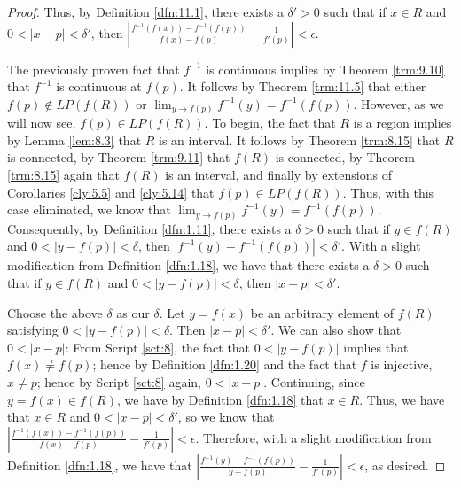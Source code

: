 \documentclass[../main.tex]{subfiles}
\begin{document}
\begin{theorem}
\begin{proof}
        Thus, by Definition \ref{dfn:11.1}, there exists a $\delta'>0$ such that if $x\in R$ and $0<|x-p|<\delta'$, then $|\frac{f^{-1}(f(x))-f^{-1}(f(p))}{f(x)-f(p)}-\frac{1}{f'(p)}|<\epsilon$.\par
        The previously proven fact that $f^{-1}$ is continuous implies by Theorem \ref{trm:9.10} that $f^{-1}$ is continuous at $f(p)$. It follows by Theorem \ref{trm:11.5} that either $f(p)\notin LP(f(R))$ or $\lim_{y\to f(p)}f^{-1}(y)=f^{-1}(f(p))$. However, as we will now see, $f(p)\in LP(f(R))$. To begin, the fact that $R$ is a region implies by Lemma \ref{lem:8.3} that $R$ is an interval. It follows by Theorem \ref{trm:8.15} that $R$ is connected, by Theorem \ref{trm:9.11} that $f(R)$ is connected, by Theorem \ref{trm:8.15} again that $f(R)$ is an interval, and finally by extensions of Corollaries \ref{cly:5.5} and \ref{cly:5.14} that $f(p)\in LP(f(R))$. Thus, with this case eliminated, we know that $\lim_{y\to f(p)}f^{-1}(y)=f^{-1}(f(p))$. Consequently, by Definition \ref{dfn:1.11}, there exists a $\delta>0$ such that if $y\in f(R)$ and $0<|y-f(p)|<\delta$, then $|f^{-1}(y)-f^{-1}(f(p))|<\delta'$. With a slight modification from Definition \ref{dfn:1.18}, we have that there exists a $\delta>0$ such that if $y\in f(R)$ and $0<|y-f(p)|<\delta$, then $|x-p|<\delta'$.\par
        Choose the above $\delta$ as our $\delta$. Let $y=f(x)$ be an arbitrary element of $f(R)$ satisfying $0<|y-f(p)|<\delta$. Then $|x-p|<\delta'$. We can also show that $0<|x-p|$: From Script \ref{sct:8}, the fact that $0<|y-f(p)|$ implies that $f(x)\neq f(p)$; hence by Definition \ref{dfn:1.20} and the fact that $f$ is injective, $x\neq p$; hence by Script \ref{sct:8} again, $0<|x-p|$. Continuing, since $y=f(x)\in f(R)$, we have by Definition \ref{dfn:1.18} that $x\in R$. Thus, we have that $x\in R$ and $0<|x-p|<\delta'$, so we know that $|\frac{f^{-1}(f(x))-f^{-1}(f(p))}{f(x)-f(p)}-\frac{1}{f'(p)}|<\epsilon$. Therefore, with a slight modification from Definition \ref{dfn:1.18}, we have that $|\frac{f^{-1}(y)-f^{-1}(f(p))}{y-f(p)}-\frac{1}{f'(p)}|<\epsilon$, as desired.
    \end{proof}
\end{theorem}
\end{document}
